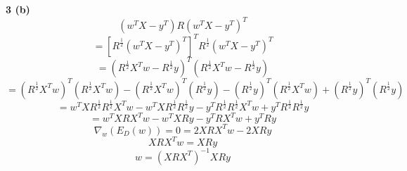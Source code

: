 \documentclass[12 pt]{article}        	%
\begin{document}
\textbf{3 (b)}
\begin{displaymath}
  (w^T X - y^T) R (w^T X - y^T)^T 
\end{displaymath}
\begin{displaymath}
  = [R^{\frac{1}{2}} (w^T X - y^T)^T]^T R^{\frac{1}{2}} (w^T X - y^T)^T 
\end{displaymath}
\begin{displaymath}
  = ( R^{\frac{1}{2}} X^T w - R^{\frac{1}{2}} y )^T ( R^{\frac{1}{2}} X^T w - R^{\frac{1}{2}} y )
\end{displaymath}
\begin{displaymath}
  = ( R^{\frac{1}{2}} X^T w )^T (R^{\frac{1}{2}} X^T w )
  - ( R^{\frac{1}{2}} X^T w )^T ( R^{\frac{1}{2}} y )
  - ( R^{\frac{1}{2}} y )^T ( R^{\frac{1}{2}} X^T w )
  + (R^{\frac{1}{2}} y )^T ( R^{\frac{1}{2}} y )
\end{displaymath}
\begin{displaymath}
  = w^T X R^{\frac{1}{2}} R^{\frac{1}{2}} X^T w 
  - w^T X R^{\frac{1}{2}} R^{\frac{1}{2}} y 
  - y^T R^{\frac{1}{2}} R^{\frac{1}{2}} X^T w
  + y^T R^{\frac{1}{2}} R^{\frac{1}{2}} y
\end{displaymath}
\begin{displaymath}
  = w^T X R X^T w 
  - w^T X R y 
  - y^T R X^T w
  + y^T R y
\end{displaymath}
\begin{displaymath}
  \nabla_w (E_D (w)) = 0 = 2 X R X^T w 
  - 2 X R y
\end{displaymath}
\begin{displaymath}
  X R X^T w = X R y
\end{displaymath}
\begin{displaymath}
  w = (X R X^T)^{-1} X R y
\end{displaymath}
\end{document}
